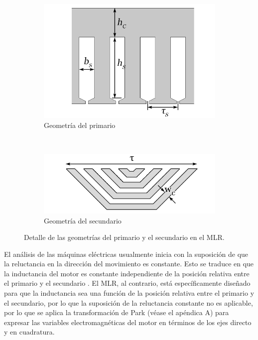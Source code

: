 \begin{figure}[b]
    \centering
    \begin{subfigure}[b]{0.49\textwidth}
        \includegraphics[width=\textwidth]{../img/Desarrollo_de_un_diseno_inicial/primary.PNG}
        \caption{Geometría del primario}
        \label{fig:primary}
    \end{subfigure}
    ~ %
    \begin{subfigure}[b]{0.49\textwidth}
        \includegraphics[width=\textwidth]{../img/Desarrollo_de_un_diseno_inicial/reactionrail.PNG}
        \caption{Geometría del secundario}
        \label{fig:reactionrail}
    \end{subfigure}
    \caption{Detalle de las geometrías del primario y el secundario en el MLR.}\label{fig:primaryreactionrail}
\end{figure}

El análisis de las máquinas eléctricas usualmente inicia con la suposición de que la reluctancia en la dirección del movimiento es constante. Esto se traduce en que la inductancia del motor es constante independiente de la posición relativa entre el primario y el secundario \cite{chapman2003}. El MLR, al contrario, está específicamente diseñado para que la inductancia sea una función de la posición relativa entre el primario y el secundario, por lo que la suposición de la reluctancia constante no es aplicable, por lo que se aplica la transformación de Park (véase el apéndica A) para expresar las variables electromagnéticas del motor en términos de los ejes directo y en cuadratura.


